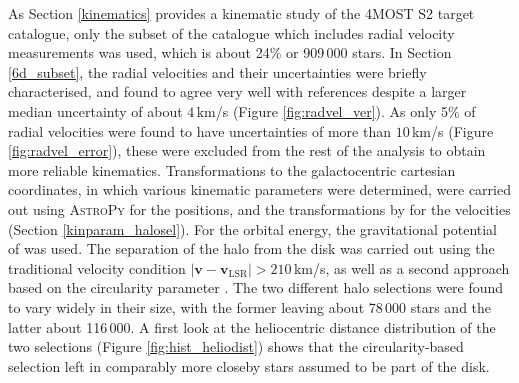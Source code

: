 \documentclass[a4paper,11pt]{article}
\begin{document}
As Section \ref{kinematics} provides a kinematic study of the 4MOST S2 target catalogue, only the subset of the catalogue which includes radial velocity measurements was used, which is about 24\% or 909\,000 stars. In Section \ref{6d_subset}, the radial velocities and their uncertainties were briefly characterised, and found to agree very well with references despite a larger median uncertainty of about $4$\,km/s (Figure \ref{fig:radvel_ver}). As only 5\% of radial velocities were found to have uncertainties of more than $10$\,km/s (Figure \ref{fig:radvel_error}), these were excluded from the rest of the analysis to obtain more reliable kinematics. Transformations to the galactocentric cartesian coordinates, in which various kinematic parameters were determined, were carried out using \textsc{AstroPy} \citep{astropy1} for the positions, and the transformations by \citet{johnson87} for the velocities (Section \ref{kinparam_halosel}). For the orbital energy, the gravitational potential of \citet{mcmillan17} was used. The separation of the halo from the disk was carried out using the traditional velocity condition $|\bm{v}-\bm{v}_\mathrm{LSR}|>210$\,km/s, as well as a second approach based on the circularity parameter \citep{sotillo23,zhu22}. The two different halo selections were found to vary widely in their size, with the former leaving about 78\,000 stars and the latter about 116\,000. A first look at the heliocentric distance distribution of the two selections (Figure \ref{fig:hist_heliodist}) shows that the circularity-based selection left in comparably more closeby stars assumed to be part of the disk.\\ \\
%
\end{document}
